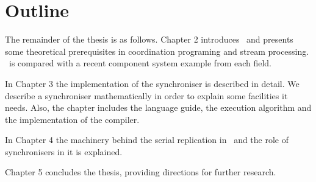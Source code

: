     \section{Outline}
The remainder of the thesis is as follows. Chapter 2 introduces \ak\ and presents some theoretical prerequisites in coordination programing and stream processing. \ak\ is compared with a recent component system example from each field.

In Chapter 3 the implementation of the synchroniser is described in detail. We describe a synchroniser mathematically in order to explain some facilities it needs. Also, the chapter includes the language guide, the execution algorithm and the implementation of the compiler.

In Chapter 4 the machinery behind the serial replication in \ak\ and the role of synchronisers in it is explained.

Chapter 5 concludes the thesis, providing directions for further research.
